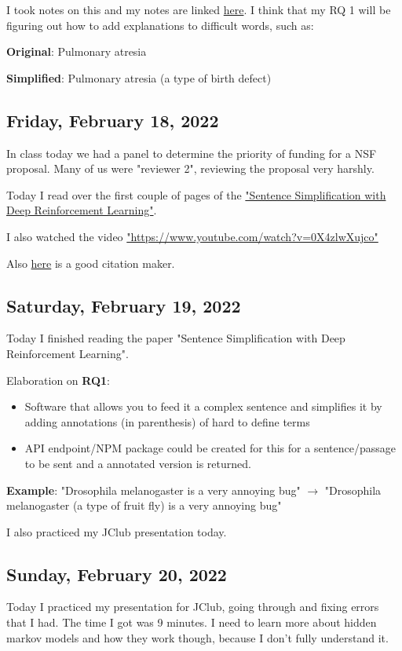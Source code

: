 \documentclass[11pt,letterpaper]{article}
\begin{document}
I took notes on this and my notes are linked \href{https://docs.google.com/document/d/1CNj_tqSD1VNpwqlWfZUubP9V462ZieM0riJjaL6dITU/edit?usp=sharing}{here}. I think that my RQ 1     will be figuring out how to add explanations to difficult words, such as: 

\textbf{Original}: Pulmonary atresia

\textbf{Simplified}: Pulmonary atresia (a type of birth defect) 

\subsection{Friday, February 18, 2022}
In class today we had a panel to determine the priority of funding for a NSF proposal. Many of us were "reviewer 2", reviewing the proposal very harshly.

Today I read over the first couple of pages of the \href{https://aclanthology.org/D17-1062.pdf}{"Sentence Simplification with Deep Reinforcement Learning"}.

I also watched the video \href{https://www.youtube.com/watch?v=0X4zlwXujco}{"https://www.youtube.com/watch?v=0X4zlwXujco"}

Also \href{https://zbib.org/}{here} is a good citation maker. 

\subsection{Saturday, February 19, 2022}
Today I finished reading the paper "Sentence Simplification with Deep Reinforcement Learning". 

Elaboration on \textbf{RQ1}:
\begin{itemize}
    \item Software that allows you to feed it a complex sentence and simplifies it by adding annotations (in parenthesis) of hard to define terms
    \item API endpoint/NPM package could be created for this for a sentence/passage to be sent and a annotated version is returned.
\end{itemize}

\textbf{Example}:
"Drosophila melanogaster is a very annoying bug" $\rightarrow$ "Drosophila melanogaster (a type of fruit fly) is a very annoying bug"

I also practiced my JClub presentation today.

\subsection{Sunday, February 20, 2022}
Today I practiced my presentation for JClub, going through and fixing errors that I had. The time I got was 9 minutes. I need to learn more about hidden markov models and how they work though, because I don't fully understand it. 
\end{document}
